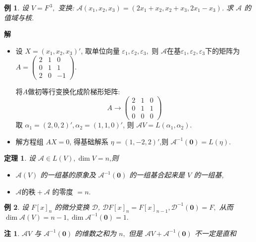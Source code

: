 \documentclass[13pt]{beamer}
\newtheorem{thm}{定理}
\newtheorem{exa}{例}
\newtheorem*{rem}{注}
\def\sol{{\bf 解~~ }}
\def\A{\mathscr{A}}
\def\D{\mathscr{D}}
\def\0{\mathbf{0}}
\begin{document}
\begin{frame}
\begin{exa}
设 $V=F^{\, 3},$ 变换: $\A \left(x_{1}, x_{2}, x_{3}\right)=\left(2 x_{1}+x_{2}, x_{2}+x_{3}, 2 x_{1}-x_{3}\right)$. 求 $\A $ 的值域与核.
\end{exa}
\sol 
\begin{itemize}
	\item 设 $X=\left( x_1, x_2, x_3 \right)'$, 
取单位向量 $\varepsilon_{1}, \varepsilon_{2}, \varepsilon_{3},$ 则 
$\A$在基$\varepsilon_{1}, \varepsilon_{2}, \varepsilon_{3}$下的矩阵为
$A=\left(\begin{array}{ccc}2 & 1 & 0 \\ 0 & 1 & 1 \\ 2 & 0 & -1\end{array}\right).$

将$A$做初等行变换化成阶梯形矩阵:
$$A\rightarrow\left(\begin{array}{ccc}2 & 1 & 0 \\ 0 & 1 & 1 \\ 0 & 0 & 0\end{array}\right)$$
取 $\alpha_{1}=(2,0,2)', \alpha_{2}=(1,1,0)'$, 
则 $\A V=L\left(\alpha_{1}, \alpha_{2}\right)$.

	\item  解方程组 $A X=0$, 得基础解系 $\eta=(1,-2,2)'$,则 $\A^{-1}(\0) =L(\eta)$.
\end{itemize}
\end{frame}



\begin{frame}
\begin{thm}
设 $\A  \in L(V), \operatorname{dim} V=n$,则 
\begin{itemize}
\item $\A (V)$ 的一组基的原象及 $\A^{-1}(\0)$ 的一组基合起来是 $V$ 的一组基,
\item $\A  \mbox{的秩}+ \A \mbox{ 的零度 }=n.$
\end{itemize}

\end{thm}

\begin{exa}
设 $F[x]_{n}$ 的微分变换 $\D$, 
$\D  F[x]_{n}=F[x]_{n-1}, \D ^{-1}(\0)=F,$ 从而 $\operatorname{dim} \A (V)=n-1, \operatorname{dim} \A ^{-1}(\0)=1 .$
\end{exa}

\begin{rem}
	$\A  V$ 与 $\A^{-1}(\0)$ 的维数之和为 $n,$ 但是 $\A  V+\A^{-1}(\0)$ 不一定是直和
\end{rem}
\end{frame}
\end{document}
